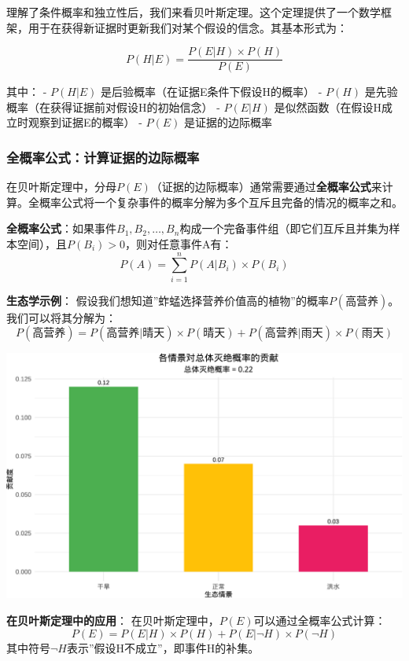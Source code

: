 \documentclass[
]{book}
\begin{document}
理解了条件概率和独立性后，我们来看贝叶斯定理。这个定理提供了一个数学框架，用于在获得新证据时更新我们对某个假设的信念。其基本形式为：

\[P(H|E) = \frac{P(E|H) \times P(H)}{P(E)}\]

其中：
- \(P(H|E)\) 是后验概率（在证据E条件下假设H的概率）
- \(P(H)\) 是先验概率（在获得证据前对假设H的初始信念）
- \(P(E|H)\) 是似然函数（在假设H成立时观察到证据E的概率）
- \(P(E)\) 是证据的边际概率

\hypertarget{ux5168ux6982ux7387ux516cux5f0fux8ba1ux7b97ux8bc1ux636eux7684ux8fb9ux9645ux6982ux7387}{%
\subsubsection{全概率公式：计算证据的边际概率}\label{ux5168ux6982ux7387ux516cux5f0fux8ba1ux7b97ux8bc1ux636eux7684ux8fb9ux9645ux6982ux7387}}

在贝叶斯定理中，分母\(P(E)\)（证据的边际概率）通常需要通过\textbf{全概率公式}来计算。全概率公式将一个复杂事件的概率分解为多个互斥且完备的情况的概率之和。

\textbf{全概率公式}：如果事件\(B_1, B_2, \ldots, B_n\)构成一个完备事件组（即它们互斥且并集为样本空间），且\(P(B_i) > 0\)，则对任意事件A有：
\[P(A) = \sum_{i=1}^{n} P(A|B_i) \times P(B_i)\]

\textbf{生态学示例}：
假设我们想知道''蚱蜢选择营养价值高的植物''的概率\(P(\text{高营养})\)。我们可以将其分解为：
\[P(\text{高营养}) = P(\text{高营养}|\text{晴天}) \times P(\text{晴天}) + P(\text{高营养}|\text{雨天}) \times P(\text{雨天})\]

\begin{center}\includegraphics[width=0.8\linewidth]{ecological-statistics_files/figure-latex/unnamed-chunk-7-1} \end{center}

\textbf{在贝叶斯定理中的应用}：
在贝叶斯定理中，\(P(E)\)可以通过全概率公式计算：
\[P(E) = P(E|H) \times P(H) + P(E|\neg H) \times P(\neg H)\]
其中符号\(\neg H\)表示''假设H不成立''，即事件H的补集。
\end{document}
